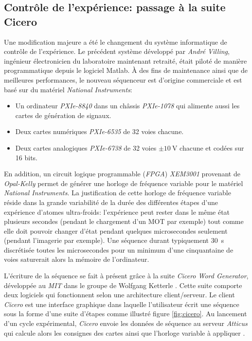 \subsection{Contrôle de l'expérience: passage à la suite Cicero}
\label{sc:cicero}
Une modification majeure a été le changement du système informatique de contrôle de l'expérience. Le précédent système développé par \emph{André Villing}, ingénieur électronicien du laboratoire maintenant retraité, était piloté de manière programmatique depuis le logiciel Matlab. À des fins de maintenance ainsi que de meilleures performances, le nouveau séquenceur est d'origine commerciale et est basé sur du matériel \emph{National Instruments}:
\begin{itemize}
\item[\textendash] Un ordinateur \emph{PXIe-8840} dans un châssis \emph{PXIe-1078} qui alimente aussi les cartes de génération de signaux.
\item[\textendash] Deux cartes numériques \emph{PXIe-6535} de 32 voies chacune.
\item[\textendash] Deux cartes analogiques \emph{PXIe-6738} de 32 voies $\pm \SI{10}{\volt}$ chacune et codées sur 16 bits.
\end{itemize}
En addition, un circuit logique programmable (\emph{FPGA}) \emph{XEM3001} provenant de \emph{Opal-Kelly} permet de générer une horloge de fréquence variable pour le matériel \emph{National Instruments}. La justification de cette horloge de fréquence variable réside dans la grande variabilité de la durée des différentes étapes d'une expérience d'atomes ultra-froids: l'expérience peut rester dans le même état plusieurs secondes (pendant le chargement d'un MOT par exemple) tout comme elle doit pouvoir changer d'état pendant quelques microsecondes seulement (pendant l'imagerie par exemple). Une séquence durant typiquement \SI{30}{\second} discrétisée toutes les microsecondes pour un minimum d'une cinquantaine de voies saturerait alors la mémoire de l'ordinateur. 

L'écriture de la séquence se fait à présent grâce à la suite \emph{Cicero Word Generator}, développée au \emph{MIT} dans le groupe de Wolfgang Ketterle \citep{keshet2013distributed}. Cette suite comporte deux logiciels qui fonctionnent selon une architecture client/serveur. Le client \emph{Cicero} est une interface graphique dans laquelle l'utilisateur écrit une séquence sous la forme d'une suite d'étapes comme illustré figure \ref{fig:cicero}. Au lancement d'un cycle expérimental, \emph{Cicero} envoie les données de séquence au serveur \emph{Atticus} qui calcule alors les consignes des cartes ainsi que l'horloge variable à appliquer \citep{keshet2008cicero}.

